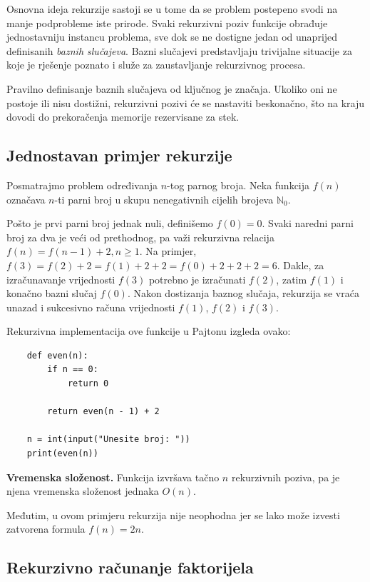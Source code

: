 Osnovna ideja rekurzije sastoji se u tome da se problem postepeno svodi na manje podprobleme iste prirode. Svaki rekurzivni poziv funkcije obrađuje jednostavniju instancu problema, sve dok se ne dostigne jedan od unaprijed definisanih \textit{baznih slučajeva}. Bazni slučajevi predstavljaju trivijalne situacije za koje je rješenje poznato i služe za zaustavljanje rekurzivnog procesa.

Pravilno definisanje baznih slučajeva od ključnog je značaja. Ukoliko oni ne postoje ili nisu dostižni, rekurzivni pozivi će se nastaviti beskonačno, što na kraju dovodi do prekoračenja memorije rezervisane za stek.

\subsection{Jednostavan primjer rekurzije}

Posmatrajmo problem određivanja $n$-tog parnog broja. Neka funkcija $f(n)$ označava $n$-ti parni broj u skupu nenegativnih cijelih brojeva $\mathbb{N}_0$.

Pošto je prvi parni broj jednak nuli, definišemo $
f(0)=0.$  Svaki naredni parni broj za dva je veći od prethodnog, pa važi rekurzivna relacija $f(n)=f(n-1)+2, n\geq 1.$ Na primjer, $f(3)=f(2)+2=f(1)+2+2=f(0)+2+2+2=6.$  Dakle, za izračunavanje vrijednosti $f(3)$ potrebno je izračunati $f(2)$, zatim $f(1)$ i konačno bazni slučaj $f(0)$. Nakon dostizanja baznog slučaja, rekurzija se vraća unazad i sukcesivno računa vrijednosti $f(1)$, $f(2)$ i $f(3)$.

Rekurzivna implementacija ove funkcije u Pajtonu izgleda ovako:

\begin{verbatim}
	def even(n):
	    if n == 0:
	        return 0
	
	    return even(n - 1) + 2

	n = int(input("Unesite broj: "))
	print(even(n))
\end{verbatim}

\textbf{Vremenska složenost.}
Funkcija izvršava tačno $n$ rekurzivnih poziva, pa je njena vremenska složenost jednaka $
O(n).$

Međutim, u ovom primjeru rekurzija nije neophodna jer se lako može izvesti zatvorena formula $f(n)=2n.$

\subsection{Rekurzivno računanje faktorijela}

